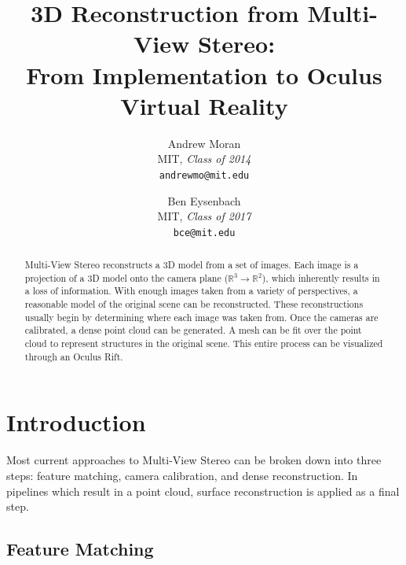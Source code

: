 \documentclass[10pt,twocolumn,letterpaper]{article}
\begin{document}
\title{3D Reconstruction from Multi-View Stereo:\\ From Implementation to Oculus Virtual Reality}

\author{Andrew Moran\\
  MIT, \textit{Class of 2014}\\
  {\tt\small andrewmo@mit.edu}
\and
Ben Eysenbach\\
MIT, \textit{Class of 2017}\\
{\tt\small bce@mit.edu}
}

\maketitle

\begin{abstract}
   Multi-View Stereo reconstructs a 3D model from a set of images. Each image is a projection of a 3D model onto the camera plane ($\mathbb{R}^3 \rightarrow \mathbb{R}^2$), which inherently results in a loss of information. With enough images taken from a variety of perspectives, a reasonable model of the original scene can be reconstructed. These reconstructions usually begin by determining where each image was taken from. Once the cameras are calibrated, a dense point cloud can be generated. A mesh can be fit over the point cloud to represent structures in the original scene. This entire process can be visualized through an Oculus Rift.
\end{abstract}

\section{Introduction}
Most current approaches to Multi-View Stereo can be broken down into three steps: feature matching, camera calibration, and dense reconstruction. In pipelines which result in a point cloud, surface reconstruction is applied as a final step.
\subsection{Feature Matching}
\end{document}
